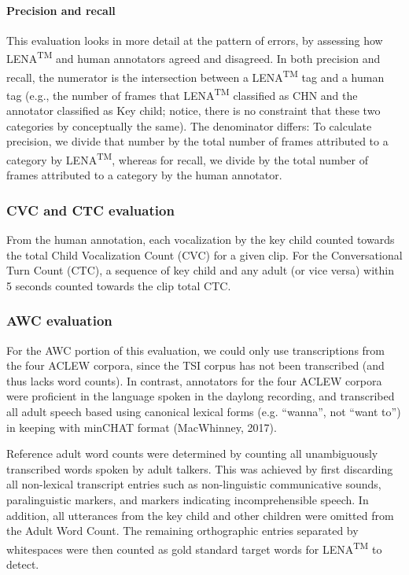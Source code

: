 \documentclass[english,floatsintext,man]{apa6}
\begin{document}
\paragraph{Precision and recall}\label{precision-and-recall}

This evaluation looks in more detail at the pattern of errors, by
assessing how LENA\textsuperscript{TM} and human annotators agreed and
disagreed. In both precision and recall, the numerator is the
intersection between a LENA\textsuperscript{TM} tag and a human tag
(e.g., the number of frames that LENA\textsuperscript{TM} classified as
CHN and the annotator classified as Key child; notice, there is no
constraint that these two categories by conceptually the same). The
denominator differs: To calculate precision, we divide that number by
the total number of frames attributed to a category by
LENA\textsuperscript{TM}, whereas for recall, we divide by the total
number of frames attributed to a category by the human annotator.

\subsubsection{CVC and CTC evaluation}\label{cvc-and-ctc-evaluation}

From the human annotation, each vocalization by the key child counted
towards the total Child Vocalization Count (CVC) for a given clip. For
the Conversational Turn Count (CTC), a sequence of key child and any
adult (or vice versa) within 5 seconds counted towards the clip total
CTC.

\subsubsection{AWC evaluation}\label{awc-evaluation}

For the AWC portion of this evaluation, we could only use transcriptions
from the four ACLEW corpora, since the TSI corpus has not been
transcribed (and thus lacks word counts). In contrast, annotators for
the four ACLEW corpora were proficient in the language spoken in the
daylong recording, and transcribed all adult speech based using
canonical lexical forms (e.g. \enquote{wanna}, not \enquote{want to}) in
keeping with minCHAT format (MacWhinney, 2017).

Reference adult word counts were determined by counting all
unambiguously transcribed words spoken by adult talkers. This was
achieved by first discarding all non-lexical transcript entries such as
non-linguistic communicative sounds, paralinguistic markers, and markers
indicating incomprehensible speech. In addition, all utterances from the
key child and other children were omitted from the Adult Word Count. The
remaining orthographic entries separated by whitespaces were then
counted as gold standard target words for LENA\textsuperscript{TM} to
detect.
\end{document}
